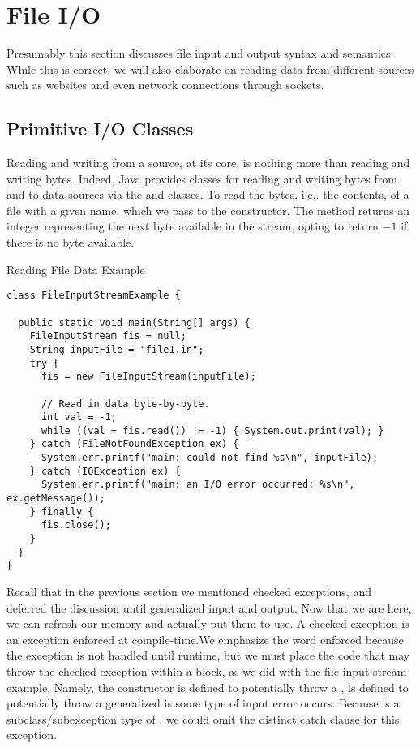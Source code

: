 \section{File I/O}

Presumably this section discusses file input and output syntax and semantics. While this is correct, we will also elaborate on reading data from different sources such as websites and even network connections through sockets. 

\subsection*{Primitive I/O Classes}

Reading and writing from a source, at its core, is nothing more than reading and writing bytes. Indeed, Java provides classes for reading and writing bytes from and to data sources via the  and  classes. To read the bytes, i.e,. the contents, of a file with a given name, which we pass to the  constructor. The  method returns an integer representing the next byte available in the stream, opting to return $-1$ if there is no byte available. 


\begin{cl}[]{Reading File Data Example}
\begin{lstlisting}[language=MyJava]
class FileInputStreamExample {

  public static void main(String[] args) {
    FileInputStream fis = null;
    String inputFile = "file1.in";
    try {
      fis = new FileInputStream(inputFile);
      
      // Read in data byte-by-byte.
      int val = -1;
      while ((val = fis.read()) != -1) { System.out.print(val); }
    } catch (FileNotFoundException ex) {
      System.err.printf("main: could not find %s\n", inputFile);
    } catch (IOException ex) {
      System.err.printf("main: an I/O error occurred: %s\n", ex.getMessage());
    } finally {
      fis.close();
    } 
  } 
}
\end{lstlisting}
\end{cl}

Recall that in the previous section we mentioned checked exceptions, and deferred the discussion until generalized input and output. Now that we are here, we can refresh our memory and actually put them to use. A checked exception is an exception enforced at compile-time.We emphasize the word enforced because the exception is not handled until runtime, but we must place the code that may throw the checked exception within a  block, as we did with the file input stream example. Namely, the  constructor is defined to potentially throw a ,  is defined to potentially throw a generalized  is some type of input error occurs. Because  is a subclass/subexception type of , we could omit the distinct catch clause for this exception. 


